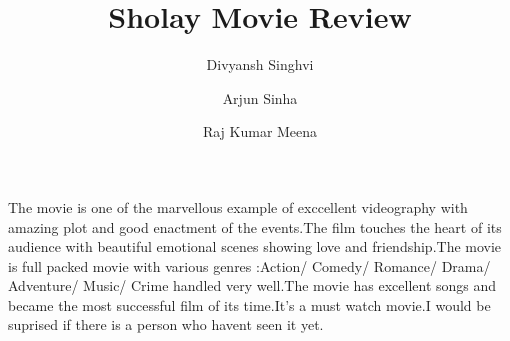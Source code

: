 \documentclass[]{article}
\title{Sholay Movie Review}
\author{Divyansh Singhvi
	\and
	Arjun Sinha
	\and
	Raj Kumar Meena}
\begin{document}
\maketitle
The movie is one of the marvellous example of exccellent videography with amazing plot and good enactment of the events.The film touches the heart of its audience with beautiful emotional scenes showing love and friendship.The movie is full packed movie with various genres :Action/ Comedy/ Romance/ Drama/ Adventure/ Music/ Crime  handled very well.The movie has excellent songs and became the most successful film of its time.It's a must watch movie.I would be suprised if there is a person who havent seen it yet.  
\end{document}
